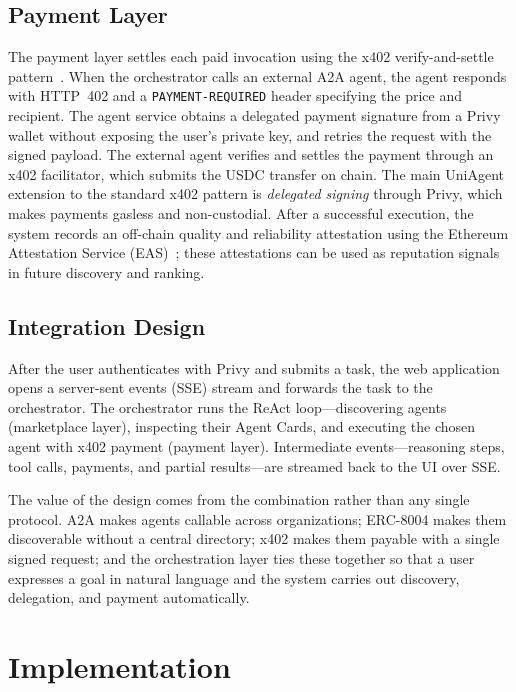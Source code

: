 \documentclass[sigconf]{acmart}
\begin{document}
\subsection{Payment Layer}
\label{sec:payment-layer}

The payment layer settles each paid invocation using the x402
verify-and-settle pattern~\cite{x402whitepaper}. When the orchestrator
calls an external A2A agent, the agent responds with HTTP~402 and a
\texttt{PAYMENT\allowbreak-\allowbreak REQUIRED} header specifying the price and recipient. The
agent service obtains a delegated payment signature from a Privy wallet
without exposing the user's private key, and retries the request with
the signed payload. The external agent verifies and settles the payment
through an x402 facilitator, which submits the USDC transfer on chain.
The main UniAgent extension to the standard x402 pattern is
\emph{delegated signing} through Privy, which makes payments gasless and
non-custodial. After a successful execution, the system records an
off-chain quality and reliability attestation using the Ethereum
Attestation Service (EAS)~\cite{eas}; these attestations can be used as
reputation signals in future discovery and ranking.

\subsection{Integration Design}
\label{sec:integration-design}

After the user authenticates with Privy and submits a task, the web
application opens a server-sent events (SSE) stream and forwards the
task to the orchestrator. The orchestrator runs the ReAct
loop---discovering agents (marketplace layer), inspecting their Agent
Cards, and executing the chosen agent with x402 payment (payment
layer). Intermediate events---reasoning steps, tool calls, payments,
and partial results---are streamed back to the UI over SSE.

The value of the design comes from the combination rather than any
single protocol. A2A makes agents callable across organizations;
ERC-8004 makes them discoverable without a central directory; x402
makes them payable with a single signed request; and the orchestration
layer ties these together so that a user expresses a goal in natural
language and the system carries out discovery, delegation, and payment
automatically.

\section{Implementation}
\label{sec:implementation}
\end{document}
